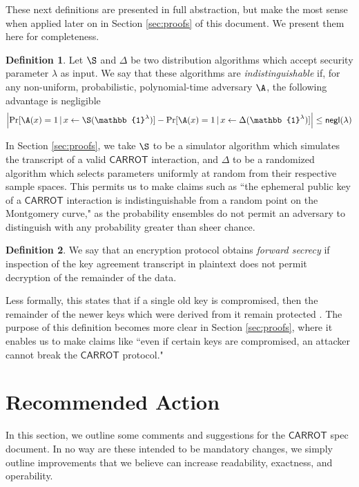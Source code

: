 \documentclass{article}
\theoremstyle{definition}
\newtheorem{definition}{Definition}
\newcommand{\6}{\mathbf}
\newcommand{\7}{\mathcal}
\newcommand{\lar}{\leftarrow}
\newcommand{\one}{\mathbb{1}}
\renewcommand{\sf}[1]{{\mathsf{#1}}}
\newcommand{\carr}{$\sf{CARROT}$ }
\begin{document}
These next definitions are presented in full abstraction, but make the most sense when applied later on in Section \ref{sec:proofs} of this document. We present them here for completeness.

\begin{definition}\label{def:indist}
    Let $\S$ and $\Delta$ be two distribution algorithms which accept security parameter $\lambda$ as input. We say that these algorithms are \textit{indistinguishable} if, for any non-uniform, probabilistic, polynomial-time adversary $\A$, the following advantage is negligible
    $$\Big| \text{Pr}[\A (x) = 1 \, | \, x \lar \S(\one^\lambda)] - \text{Pr}[\A (x) = 1 \, | \, x \lar \Delta(\one^\lambda)] \Big| \leq \mathsf{negl}(\lambda)$$
\end{definition}

In Section \ref{sec:proofs}, we take $\S$ to be a simulator algorithm which simulates the transcript of a valid \carr interaction, and $\Delta$ to be a randomized algorithm which selects parameters uniformly at random from their respective sample spaces. This permits us to make claims such as ``the ephemeral public key of a \carr interaction is indistinguishable from a random point on the Montgomery curve," as the probability ensembles do not permit an adversary to distinguish with any probability greater than sheer chance.
\medskip

\begin{definition}\label{def:forward}
    We say that an encryption protocol obtains \textit{forward secrecy} if inspection of the key agreement transcript in plaintext does not permit decryption of the remainder of the data.
\end{definition}

Less formally, this states that if a single old key is compromised, then the remainder of the newer keys which were derived from it remain protected \cite{ForwardSec}. The purpose of this definition becomes more clear in Section \ref{sec:proofs}, where it enables us to make claims like ``even if certain keys are compromised, an attacker cannot break the \carr protocol."







\section{Recommended Action}\label{sec:comments}

In this section, we outline some comments and suggestions for the \carr spec document. In no way are these intended to be mandatory changes, we simply outline improvements that we believe can increase readability, exactness, and operability.
\end{document}
